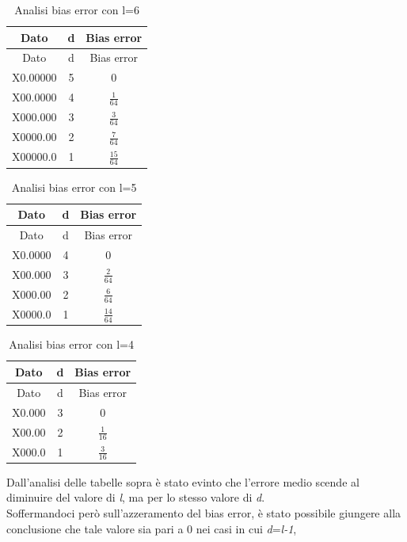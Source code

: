 \documentclass[a4paper, titlepage]{article}
\begin{document}
\begin{longtable}{*3c}
\caption{Analisi bias error con l=6}
\label{tab:Analisi bias error variando i parametri l e d}\\
\toprule
Dato & d & Bias error\\
\midrule
\endfirsthead
Dato & d & Bias error\\
\midrule
\endhead
\midrule
\endfoot
\bottomrule
\endlastfoot
X0.00000 & 5 & 0 \\ 
X00.0000 & 4 & $\frac{1}{64}$ \\ 
X000.000 & 3 & $\frac{3}{64}$  \\ 
X0000.00 & 2 & $\frac{7}{64}$ \\ 
X00000.0 & 1 & $\frac{15}{64}$ \\ 
\end{longtable}
\begin{longtable}{*3c}
\caption{Analisi bias error con l=5}
\label{tab:Analisi bias error con l=5}\\
\toprule
Dato & d & Bias error\\
\midrule
\endfirsthead
Dato & d & Bias error\\
\midrule
\endhead
\midrule
\endfoot
\bottomrule
\endlastfoot
X0.0000 & 4 & 0 \\ 
X00.000 & 3 & $\frac{2}{64}$ \\ 
X000.00 & 2 & $\frac{6}{64}$ \\ 
X0000.0 & 1 & $\frac{14}{64}$ \\ 
\end{longtable}
\begin{longtable}{*3c}
\caption{Analisi bias error con l=4}
\label{tab:Analisi bias error con l=4}\\
\toprule
Dato & d & Bias error\\
\midrule
\endfirsthead
Dato & d & Bias error\\
\midrule
\endhead
\midrule
\endfoot
\bottomrule
\endlastfoot
X0.000 & 3 & 0\\ 
X00.00 & 2 & $\frac{1}{16}$ \\
X000.0 & 1 & $\frac{3}{16}$ \\
\end{longtable}
Dall'analisi delle tabelle sopra è stato evinto che l'errore medio scende al diminuire del valore di \textit{l}, ma per lo stesso valore di \textit{d}.\\
Soffermandoci però sull'azzeramento del bias error, è stato possibile giungere alla conclusione che tale valore sia pari a 0 nei casi in cui \textit{d}=\textit{l-1},%
\end{document}

